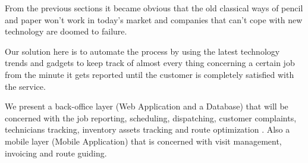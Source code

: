 From the previous sections it became obvious that the old classical ways of pencil and paper won't work in today's market and companies that can't cope with new technology are doomed to failure.

Our solution here is to automate the process by using the latest technology trends and gadgets to keep track of almost every thing concerning a certain job from the minute it gets reported until the customer is completely satisfied with the service.

We present a back-office layer (Web Application and a Database) that will be concerned with the job reporting, scheduling, dispatching, customer complaints, technicians tracking, inventory assets tracking and route optimization . Also a mobile layer (Mobile Application) that is concerned with visit management, invoicing and route guiding.